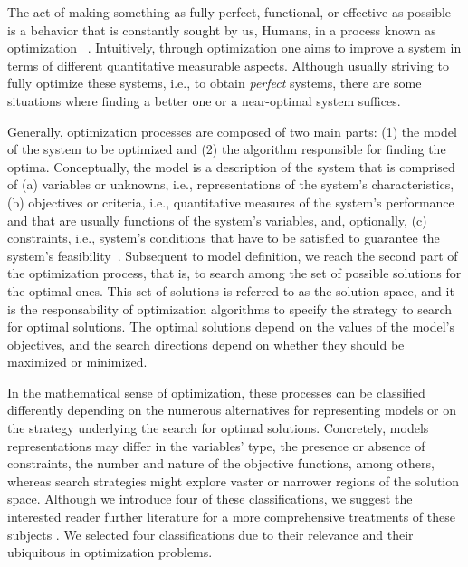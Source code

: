 \cleardoublepage
\label{chap:intro}

	The act of making something as fully perfect, functional, or effective as possible is a behavior that is constantly sought by us, Humans, in a process known as optimization ~\cite{MerriamWebster2017OptimizationDefinition}. Intuitively, through optimization one aims to improve a system in terms of different quantitative measurable aspects. Although usually striving to fully optimize these systems, i.e., to obtain \textit{perfect} systems, there are some situations where finding a better one or a near-optimal system suffices.

	Generally, optimization processes are composed of two main parts: (1) the model of the system to be optimized and (2) the algorithm responsible for finding the optima. Conceptually, the model is a description of the system that is comprised of (a) variables or unknowns, i.e., representations of the system's characteristics, (b) objectives or criteria, i.e., quantitative measures of the system's performance and that are usually functions of the system's variables, and, optionally, (c) constraints, i.e., system's conditions that have to be satisfied to guarantee the system's feasibility~\cite{Nocedal2011NumericalOptimization}. Subsequent to model definition, we reach the second part of the optimization process, that is, to search among the set of possible solutions for the optimal ones. This set of solutions is referred to as the solution space, and it is the responsability of optimization algorithms to specify the strategy to search for optimal solutions. The optimal solutions depend on the values of the model's objectives, and the search directions depend on whether they should be maximized or minimized. 
	
	In the mathematical sense of optimization, these processes can be classified differently depending on the numerous alternatives for representing models or on the strategy underlying the search for optimal solutions. Concretely, models representations may differ in the variables' type, the presence or absence of constraints, the number and nature of the objective functions, among others, whereas search strategies might explore vaster or narrower regions of the solution space. Although we introduce four of these classifications, we suggest the interested reader further literature for a more comprehensive treatments of these subjects \cite{Nocedal2011NumericalOptimization,Nemhauser1988}. We selected four classifications due to their relevance and their ubiquitous in optimization problems.
	
